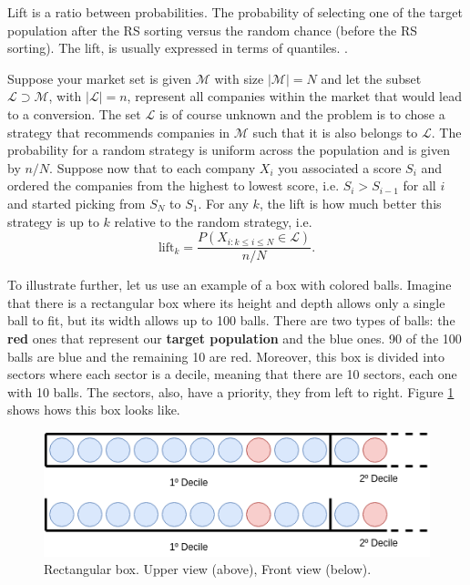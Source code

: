 Lift is a ratio between probabilities. The probability of selecting one of the target population after the RS sorting versus the random  chance (before the RS sorting). The lift, is usually expressed in terms of quantiles. \cite{LiftAnalysisADataScientistsSecretWeapon}.

Suppose your market set is given $\mathcal M$ with size $|\mathcal M |\!=\!N$ and let the subset $\mathcal L \supset \mathcal M $, with $|\mathcal L|\!=\!n$, represent all companies within the market that would lead to a conversion. The set $\mathcal L$ is of course unknown and the problem is to chose a strategy that recommends companies in $\mathcal M$ such that it is also belongs to $\mathcal L$. The probability for a random strategy is uniform across the population and is given by $n/N$. Suppose now that to each company $X_i$ you associated a score $S_i$ and ordered the companies from the highest to lowest score, i.e. $S_i>S_{i-1}$ for all $i$ and started picking from $S_N$ to $S_1$. For any $k$, the lift is how much better this strategy is up to $k$ relative to the random strategy, i.e.
\begin{equation}
    \mathrm{lift}_k = \frac{P(X_{i:k\leq i\leq N}\in \mathcal L)}{n/N}.
\end{equation}


To illustrate further, let us use an example of a box with colored balls. Imagine that there is a rectangular box where its height and depth allows only a single ball to fit, but its width allows up to 100 balls. There are two types of balls: the \textbf{red} ones that represent our \textbf{target population} and the blue ones. 90 of the 100 balls are blue and the remaining 10 are red. Moreover, this box is divided into sectors where each sector is a decile, meaning that there are 10 sectors, each one with 10 balls. The sectors, also, have a priority, they from left to right. Figure \ref{fig:rec-box} shows hows this box looks like.

\begin{figure}[h]
   \centering
   \includegraphics[width=\linewidth]{fig/ch2-rec-box.png}
   \caption{Rectangular box. Upper view (above), Front view (below). }
   \label{fig:rec-box}
\end{figure}

